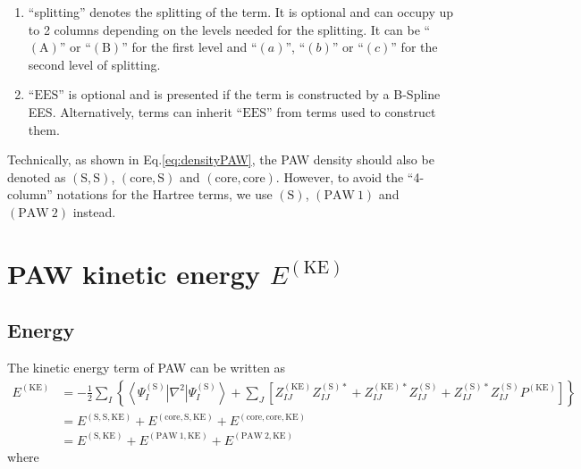 \documentclass[paper=a4, fontsize=11pt]{article} %
\numberwithin{equation}{section} %
\numberwithin{figure}{section} %
\numberwithin{table}{section} %
\newcommand{\rS}{{\mathrm{S}}}
\newcommand{\rKE}{{\mathrm{KE}}}
\newcommand{\rEES}{{\mathrm{EES}}}
\newcommand{\rcore}{{\mathrm{core}}}
\newcommand{\rP}{{\mathrm{PAW}}}
\newcommand{\rA}{{\mathrm{A}}}
\newcommand{\rB}{{\mathrm{B}}}
\begin{document}
\begin{enumerate}
\item ``splitting'' denotes the splitting of the term. It is optional and can occupy up to 2 columns depending on the levels needed for the splitting. It can be ``$(\rA)$'' or ``$(\rB)$'' for the first level and ``$(a)$'', ``$(b)$'' or ``$(c)$'' for the second level of splitting.
\item ``$\rEES$'' is optional and is presented if the term is constructed by a B-Spline EES. Alternatively, terms can inherit ``$\rEES$'' from terms used to construct them.
\end{enumerate}

Technically, as shown in Eq.\eqref{eq:densityPAW}, the PAW density should also be denoted as $(\rS,\rS)$, $(\rcore,\rS)$ and $(\rcore,\rcore)$. However, to avoid the ``4-column'' notations for the Hartree terms, we use $(\rS)$, $(\rP\ 1)$ and $(\rP\ 2)$ instead.

\newpage
\section{PAW kinetic energy $E^{(\rKE)}$}
\subsection{Energy}
The kinetic energy term of PAW can be written as
\begin{equation} \label{eq:PAWKE}
\begin{split}
E^{(\rKE)}
&=-\frac{1}{2}\sum_I \left\{\left<\Psi_I^{(\rS)}|\nabla^2|\Psi_I^{(\rS)}\right> + \sum_J \left[Z_{IJ}^{(\rKE)}Z_{IJ}^{(\rS)*} + Z_{IJ}^{(\rKE)*}Z_{IJ}^{(\rS)} +  Z_{IJ}^{(\rS)*}Z_{IJ}^{(\rS)}P^{(\rKE)}\right]\right\} \\
&=E^{(\rS,\rS,\rKE)}+ E^{(\rcore,\rS,\rKE)} + E^{(\rcore,\rcore,\rKE)} \\
&= E^{(\rS,\rKE)}+ E^{(\rP\ 1,\rKE)} + E^{(\rP\ 2,\rKE)} 
\end{split}
\end{equation}
where
\end{document}
